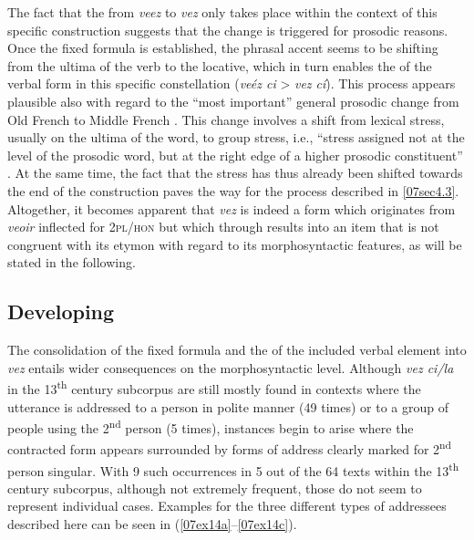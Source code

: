 \documentclass[output=paper,colorlinks,citecolor=brown]{langscibook}
\begin{document}
The fact that the  from \emph{veez} to \emph{vez} only takes place within the context of this specific construction suggests that the change is triggered for prosodic reasons. Once the fixed formula is established, the phrasal accent seems to be shifting from the ultima of the verb to the locative, which in turn enables the  of the verbal form in this specific constellation (\emph{veéz ci} \textgreater{} \emph{vez cí}). This process appears plausible also with regard to the ``most important'' general prosodic change from Old French to Middle French \citep[470]{gessjacobslaks2020}. This change involves a shift from lexical stress, usually on the ultima of the word, to group stress, i.e., ``stress assigned not at the level of the prosodic word, but at the right edge of a higher prosodic constituent'' \citep[63--64]{rainsford2020}. At the same time, the fact that the stress has thus already been shifted towards the end of the construction paves the way for the  process described in \ref{07sec4.3}. Altogether, it becomes apparent that \emph{vez} is indeed a form which originates from \emph{veoir} inflected for \textsc{2pl/hon} but which through  results into an item that is not congruent with its etymon with regard to its morphosyntactic features, as will be stated in the following.

\subsection{Developing } \label{07sec4.2}

\largerpage[-1]

The consolidation of the fixed formula and the  of the included verbal element into \emph{vez} entails wider consequences on the morphosyntactic level. Although \emph{vez ci/la} in the
13\textsuperscript{th} century subcorpus are still mostly found in contexts where the utterance is addressed to a person in polite manner (49 times) or to a group of people using the 2\textsuperscript{nd} person  (5 times), instances begin to arise where the contracted form appears surrounded by forms of address clearly marked for 2\textsuperscript{nd} person singular. With 9 such occurrences in 5 out of the 64 texts within the 13\textsuperscript{th} century subcorpus,
although not extremely frequent, those do not seem to represent individual cases. Examples for the three different types of addressees described here can be seen in (\ref{07ex14a}--\ref{07ex14c}).
\end{document}
